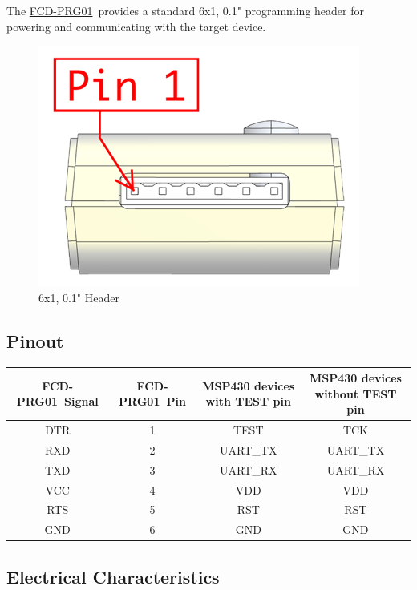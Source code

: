 \documentclass[10pt,letterpaper]{datasheet}
\newcommand{\PIDNOLINK}{FCD\nobreakdash-PRG01}
\newcommand{\PID}{\href{http://www.flyingcampdesign.com/msp430-bsl-programmer.html}{\PIDNOLINK}}
\begin{document}
\begin{flushleft}
  The \PID\ provides a standard 6x1, 0.1" programming header for powering and communicating with the target device. \\

  \begin{figure}[!h]
    \label{fig:fcd-prg01-pinout}
    \begin{center}
      \includegraphics[width=2 in]{fcd-prg01-pinout}
    \end{center}
    \caption{6x1, 0.1" Header}
  \end{figure}

  \subsection*{Pinout}
  \begin{flushleft}
    \label{tab:pinout}
    \begin{tabular}{|c|c|c|c|}
      \hline
      \PIDNOLINK\ Signal &
      \PIDNOLINK\  Pin &
      MSP430 devices with TEST pin &
      MSP430 devices without TEST pin \\
      \hline
      DTR & 1 & TEST & TCK \\
      RXD & 2 & UART\_TX & UART\_TX \\
      TXD & 3 & UART\_RX & UART\_RX \\
      VCC & 4 & VDD & VDD \\
      RTS & 5 & RST & RST \\
      GND & 6 & GND & GND \\
      \hline
    \end{tabular}
  \end{flushleft}

  \bigskip

  \subsection*{Electrical Characteristics}

\end{flushleft}
\end{document}
